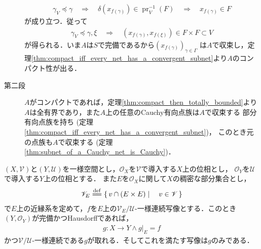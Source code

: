 \begin{prf}
\begin{description}
				\begin{align}
					\gamma_V \preceq \gamma
					\quad \Longrightarrow \quad
					\delta(x_{f(\gamma)}) \in \operatorname{pr}_V^{-1}(F)
					\quad \Longrightarrow \quad
					x_{f(\gamma)} \in F
				\end{align}
				が成り立つ．従って
				\begin{align}
					\gamma_V \preceq \gamma,\xi
					\quad \Longrightarrow \quad
					\left(x_{f(\gamma)},x_{f(\xi)}\right) \in F \times F \subset V
				\end{align}
				が得られる．いま$A$は$S$で完備であるから$(x_{f(\gamma)})_{\gamma \in \Gamma}$
				は$A$で収束し，定理\ref{thm:compact_iff_every_net_has_a_convergent_subnet}より$A$のコンパクト性が出る．
				
			\item[第二段]
				$A$がコンパクトであれば，定理\ref{thm:compact_then_totally_bounded}より
				$A$は全有界であり，また$A$上の任意のCauchy有向点族は$A$で収束する
				部分有向点族を持ち
				(定理\ref{thm:compact_iff_every_net_has_a_convergent_subnet})，
				このとき元の点族も$A$で収束する
				(定理\ref{thm:subnet_of_a_Cauchy_net_is_Cauchy})．
				\QED
		\end{description}
	\end{prf}
	
	\begin{screen}
		\begin{thm}[稠密な部分集合上の一様連続写像の延長]
			$(X,\mathscr{V})$と$(Y,\mathscr{U})$を一様空間とし，$\mathscr{O}_X$を$\mathscr{V}$で導入する$X$上の位相とし，
			$\mathscr{O}_Y$を$\mathscr{U}$で導入する$Y$上の位相とする．
			また$E$を$\mathscr{O}_X$に関して$X$の稠密な部分集合とし，
			\begin{align}
				\mathscr{V}_E \defeq \Set{v \cap (E \times E)}{v \in \mathscr{V}}
			\end{align}
			で$E$上の近縁系を定めて，$f$を$E$上の$\mathscr{V}_E/\mathscr{U}$-一様連続写像とする．このとき
			$(Y,\mathscr{O}_Y)$が完備かつHausdorffであれば，
			\begin{align}
				g:X \longrightarrow Y \wedge g|_E = f
			\end{align}
			かつ$\mathscr{V}/\mathscr{U}$-一様連続である$g$が取れる．そしてこれを満たす写像は$g$のみである．
		\end{thm}
	\end{screen}
	
